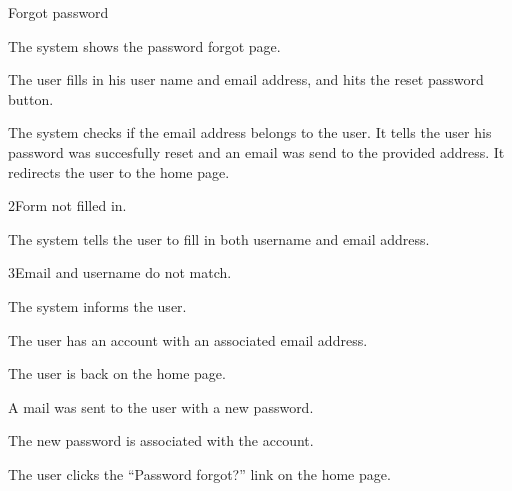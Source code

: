 
\begin{uc}{Forgot password}

    \begin{uc-mss}
    \item The system shows the password forgot page. %
    \item The user fills in his user name and email address, and hits the reset
        password button.
    \item The system checks if the email address belongs to the user. It tells
        the user his password was succesfully reset and an email was send to the
        provided address. It redirects the user to the home page.
    \end{uc-mss}

    \begin{uc-ext}

        \begin{uc-fail}{2}{Form not filled in.}
        \item The system tells the user to fill in both username and email
            address.
        \end{uc-fail}

        \begin{uc-fail}{3}{Email and username do not match.}
        \item The system informs the user.
        \end{uc-fail}

    \end{uc-ext}

    \begin{uc-pre}
    \item The user has an account with an associated email address.
    \end{uc-pre}

    \begin{uc-post}
    \item The user is back on the home page.
    \item A mail was sent to the user with a new password.
    \item The new password is associated with the account.
    \end{uc-post}

    \begin{uc-trig}
        The user clicks the ``Password forgot?'' link on the home page.
    \end{uc-trig}

\end{uc}

